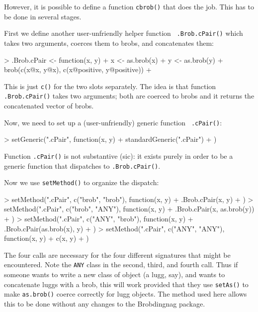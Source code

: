 \documentclass[a4paper]{article}
\begin{document}
However, it is possible to define a function {\tt cbrob()} that does
the job.  This has to be done in several stages.

First we define another user-unfriendly helper function {\tt
.Brob.cPair()} which takes two arguments, coerces them to brobs, and
concatenates them:

\begin{Schunk}
\begin{Sinput}
> .Brob.cPair <- function(x, y) {
+     x <- as.brob(x)
+     y <- as.brob(y)
+     brob(c(x@x, y@x), c(x@positive, y@positive))
+ }
\end{Sinput}
\end{Schunk}

This is just {\tt c()} for the two slots separately.  The idea is that
function {\tt .Brob.cPair()} takes two arguments; both are coerced to
brobs and it returns the concatenated vector of brobs.

Now, we need to set up a (user-unfriendly) generic function {\tt
.cPair()}:

\begin{Schunk}
\begin{Sinput}
> setGeneric(".cPair", function(x, y) {
+     standardGeneric(".cPair")
+ })
\end{Sinput}
\end{Schunk}

Function {\tt .cPair()} is not substantive (sic): it exists purely in
order to be a generic function that dispatches to {\tt .Brob.cPair()}.

Now we use {\tt setMethod()} to organize the dispatch:


\begin{Schunk}
\begin{Sinput}
> setMethod(".cPair", c("brob", "brob"), function(x, y) {
+     .Brob.cPair(x, y)
+ })
> setMethod(".cPair", c("brob", "ANY"), function(x, y) {
+     .Brob.cPair(x, as.brob(y))
+ })
> setMethod(".cPair", c("ANY", "brob"), function(x, y) {
+     .Brob.cPair(as.brob(x), y)
+ })
> setMethod(".cPair", c("ANY", "ANY"), function(x, y) {
+     c(x, y)
+ })
\end{Sinput}
\end{Schunk}


The four calls are necessary for the four different signatures that
might be encountered.  Note the {\tt ANY} class in the second, third,
and fourth call.  Thus if someone wants to write a new class of object
(a lugg, say), and wants to concatenate luggs with a brob, this will
work provided that they use {\tt setAs()} to make {\tt as.brob()}
coerce correctly for lugg objects.  The method used here allows this
to be done without any changes to the Brobdingnag package.
\end{document}
